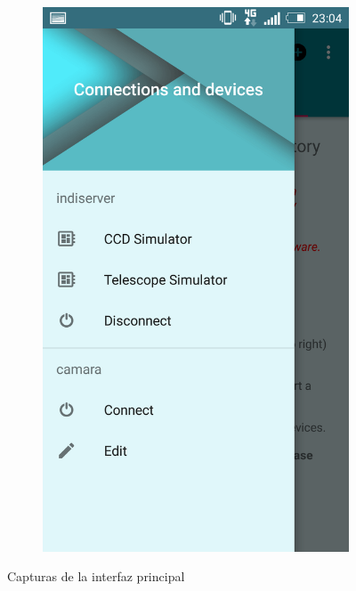\begin{figure}
\begin{subfigure}[]{0.4\textwidth}
        \includegraphics[width=\textwidth]{../images/captura7.png}
        \caption{}
        \label{fig:captura5}
    \end{subfigure}
    \caption{Capturas de la interfaz principal}\label{fig:capturas3}
\end{figure}

